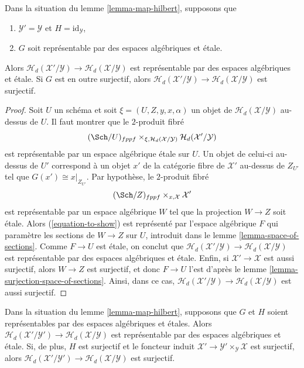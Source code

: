 \begin{lemma}
\label{lemma-etale-covering-hilbert}
Dans la situation du
lemme \ref{lemma-map-hilbert},
supposons que
\begin{enumerate}
\item $\mathcal{Y}' = \mathcal{Y}$ et $H = \text{id}_\mathcal{Y}$,
\item $G$ soit représentable par des espaces algébriques et étale.
\end{enumerate}
Alors $\mathcal{H}_d(\mathcal{X}'/\mathcal{Y}) \to
\mathcal{H}_d(\mathcal{X}/\mathcal{Y})$ est représentable par
des espaces algébriques et étale.
Si $G$ est en outre surjectif, alors
$\mathcal{H}_d(\mathcal{X}'/\mathcal{Y}) \to
\mathcal{H}_d(\mathcal{X}/\mathcal{Y})$ est surjectif.
\end{lemma}

\begin{proof}
Soit $U$ un schéma et soit $\xi = (U, Z, y, x, \alpha)$ un objet de
$\mathcal{H}_d(\mathcal{X}/\mathcal{Y})$ au-dessus de $U$.
Il faut montrer que le $2$-produit fibré
\begin{equation}
\label{equation-to-show}
(\Sch/U)_{fppf}
\times_{\xi, \mathcal{H}_d(\mathcal{X}/\mathcal{Y})}
\mathcal{H}_d(\mathcal{X}'/\mathcal{Y})
\end{equation}
est représentable par un espace algébrique étale sur $U$.
Un objet de celui-ci au-dessus de $U'$ correspond à un objet
$x'$ de la catégorie fibre de $\mathcal{X}'$ au-dessus de $Z_{U'}$
tel que $G(x') \cong x|_{Z_{U'}}$.
Par hypothèse, le $2$-produit fibré
$$
(\Sch/Z)_{fppf} \times_{x, \mathcal{X}} \mathcal{X}'
$$
est représentable par un espace algébrique $W$ tel que la projection
$W \to Z$ soit étale. Alors (\ref{equation-to-show})
est représenté par l'espace algébrique $F$ qui paramètre les sections de
$W \to Z$ sur $U$, introduit dans le
lemme \ref{lemma-space-of-sections}.
Comme $F \to U$ est étale, on conclut que
$\mathcal{H}_d(\mathcal{X}'/\mathcal{Y}) \to
\mathcal{H}_d(\mathcal{X}/\mathcal{Y})$ est représentable par
des espaces algébriques et étale.
Enfin, si $\mathcal{X}' \to \mathcal{X}$ est aussi surjectif,
alors $W \to Z$ est surjectif, et donc $F \to U$ l'est d'après le
lemme \ref{lemma-surjection-space-of-sections}.
Ainsi, dans ce cas,
$\mathcal{H}_d(\mathcal{X}'/\mathcal{Y}) \to
\mathcal{H}_d(\mathcal{X}/\mathcal{Y})$ est aussi surjectif.
\end{proof}

\begin{lemma}
\label{lemma-etale-map-hilbert}
Dans la situation du
lemme \ref{lemma-map-hilbert},
supposons que $G$ et $H$ soient représentables par des espaces algébriques et étales.
Alors $\mathcal{H}_d(\mathcal{X}'/\mathcal{Y}') \to
\mathcal{H}_d(\mathcal{X}/\mathcal{Y})$ est représentable par
des espaces algébriques et étale.
Si, de plus, $H$ est surjectif et le foncteur induit
$\mathcal{X}' \to \mathcal{Y}' \times_\mathcal{Y} \mathcal{X}$
est surjectif, alors
$\mathcal{H}_d(\mathcal{X}'/\mathcal{Y}') \to
\mathcal{H}_d(\mathcal{X}/\mathcal{Y})$ est surjectif.
\end{lemma}

